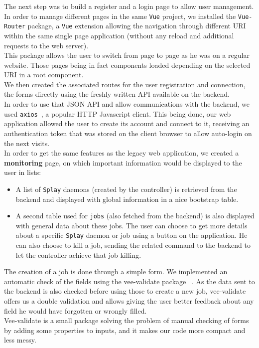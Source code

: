 \documentclass{eplmastersthesis}
\begin{document}
        The next step was to build a register and a login page to allow
        user management. In order to manage different pages in the same \texttt{Vue}
        project, we installed the \texttt{Vue-Router} package, a \texttt{Vue} extension
        allowing the navigation through different URI within the same
        single page application (without any reload and additional requests
        to the web server).\\
        This package allows the user to switch from page to page
        as he was on a regular website. Those pages being in fact components
        loaded depending on the selected URI in a root component.\\
        We then created the associated routes for the user registration and
        connection, the forms directly using the freshly written API available
        on the backend.\\
        In order to use that JSON API and allow communications with the
        backend, we used \texttt{axios}~\cite{axios}, a popular HTTP Javascript client.
        This being done, our web application allowed the user to create its
        account and connect to it, receiving an authentication token that
        was stored on the client browser to allow auto-login on the next
        visits.\\

        In order to get the same features as the legacy web application,
        we created a \textbf{monitoring} page, on which important
        information would be displayed to the user in lists:

        \begin{itemize}
          \item A list of \texttt{Splay} daemons (created by the controller) is retrieved
          from the backend and displayed with global information in a nice
          bootstrap table.
          \item A second table used for \texttt{jobs} (also fetched from the backend) is also
          displayed with general data about these jobs. The user can choose to
          get more details about a specific \texttt{Splay} daemon or job using a button
          on the application. He can also choose to kill a job, sending the
          related command to the backend to let the controller achieve that job
          killing.
        \end{itemize}

        The creation of a job is done through a simple form. We implemented
        an automatic check of the fields using the vee-validate package
       ~\cite{VeeValidate}. As the data sent to the backend is also checked
        before using those to create a new job, vee-validate offers us
        a double validation and allows giving the user better feedback
        about any field he would have forgotten or wrongly filled.\\
        Vee-validate is a small package solving the problem of
        manual checking of forms by adding some properties to inputs, and it
        makes our code more compact and less messy.
\end{document}
